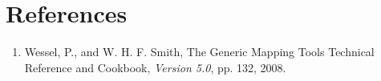 \documentclass{report}
\begin{document}
\chapter{References} 
\thispagestyle{headings}

\begin{enumerate}

\item Wessel, P., and W. H. F. Smith, The Generic Mapping Tools Technical Reference and Cookbook,
{\it Version 5.0}, pp. 132, 2008.

\end{enumerate}

\clearpage
\thispagestyle{headings}
\printindex
\thispagestyle{headings}
\end{document}
